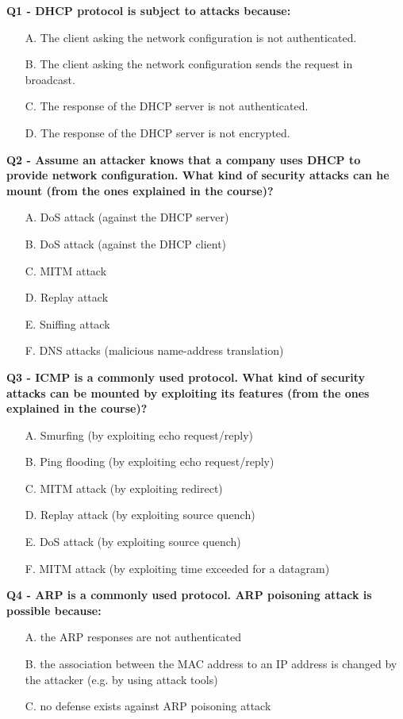 \textbf{Q1 - DHCP protocol is subject to attacks because:}
\begin{itemize}
    \item[A.] The client asking the network configuration is not authenticated.
    \item[B.] The client asking the network configuration sends the request in broadcast.
    \item[C.] The response of the DHCP server is not authenticated.
    \item[D.] The response of the DHCP server is not encrypted.
\end{itemize}

\textbf{Q2 - Assume an attacker knows that a company uses DHCP to provide network configuration. What kind of security attacks can he mount (from the ones explained in the course)?}
\begin{itemize}
    \item[A.] DoS attack (against the DHCP server)
    \item[B.] DoS attack (against the DHCP client)
    \item[C.] MITM attack
    \item[D.] Replay attack
    \item[E.] Sniffing attack
    \item[F.] DNS attacks (malicious name-address translation)
\end{itemize}

\textbf{Q3 - ICMP is a commonly used protocol. What kind of security attacks can be mounted by exploiting its features (from the ones explained in the course)?}
\begin{itemize}
    \item[A.] Smurfing (by exploiting echo request/reply)
    \item[B.] Ping flooding (by exploiting echo request/reply)
    \item[C.] MITM attack (by exploiting redirect)
    \item[D.] Replay attack (by exploiting source quench)
    \item[E.] DoS attack (by exploiting source quench)
    \item[F.] MITM attack (by exploiting time exceeded for a datagram)
\end{itemize}

\textbf{Q4 - ARP is a commonly used protocol. ARP poisoning attack is possible because:}
\begin{itemize}
    \item[A.] the ARP responses are not authenticated
    \item[B.] the association between the MAC address to an IP address is changed by the attacker (e.g. by using attack tools)
    \item[C.] no defense exists against ARP poisoning attack
\end{itemize}

